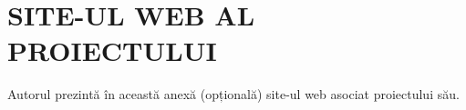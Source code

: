 \chapter{SITE-UL WEB AL PROIECTULUI}

Autorul prezintă în această anexă (opțională) site-ul web asociat proiectului său.